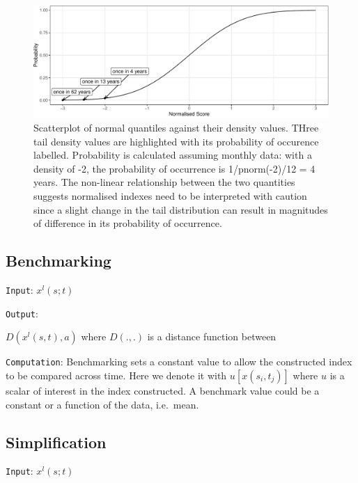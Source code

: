 \documentclass[
]{interact}
\begin{document}
\begin{figure}

{\centering \includegraphics{tidyindex_files/figure-pdf/fig-normalising-1.pdf}

}

\caption{\label{fig-normalising}Scatterplot of normal quantiles against
their density values. THree tail density values are highlighted with its
probability of occurence labelled. Probability is calculated assuming
monthly data: with a density of -2, the probability of occurrence is
1/pnorm(-2)/12 = 4 years. The non-linear relationship between the two
quantities suggests normalised indexes need to be interpreted with
caution since a slight change in the tail distribution can result in
magnitudes of difference in its probability of occurrence.}

\end{figure}

\hypertarget{benchmarking}{%
\subsection{Benchmarking}\label{benchmarking}}

\texttt{Input}: \(x^l(s; t)\)

\texttt{Output}:

\(D(x^l(s,t), a)\) where \(D(., .)\) is a distance function between

\texttt{Computation}: Benchmarking sets a constant value to allow the
constructed index to be compared across time. Here we denote it with
\(u[x(s_i, t_j)]\) where \(u\) is a scalar of interest in the index
constructed. A benchmark value could be a constant or a function of the
data, i.e.~mean.

\hypertarget{simplification}{%
\subsection{Simplification}\label{simplification}}

\texttt{Input}: \(x^l(s; t)\)
\end{document}
